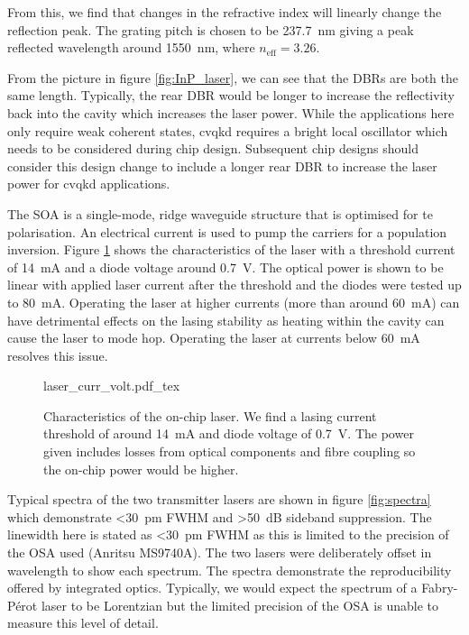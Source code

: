 From this, we find that changes in the refractive index will linearly change the reflection peak. The grating pitch is chosen to be \SI{237.7}{nm} giving a peak reflected wavelength around \SI{1550}{nm}, where $n_\text{eff} = 3.26$.

From the picture in figure \ref{fig:InP_laser}, we can see that the \acp{DBR} are both the same length. Typically, the rear \ac{DBR} would be longer to increase the reflectivity back into the cavity which increases the laser power. While the applications here only require weak coherent states, \ac{cvqkd} \cite{Ralph1999} requires a bright local oscillator which needs to be considered during chip design. Subsequent chip designs should consider this design change to include a longer rear \ac{DBR} to increase the laser power for \ac{cvqkd} applications.

The \ac{SOA} is a single-mode, ridge waveguide structure that is optimised for \ac{te} polarisation. An electrical current is used to pump the carriers for a population inversion. Figure \ref{fig:las_curr_volt} shows the characteristics of the laser with a threshold current of \SI{14}{\mA} and a diode voltage around \SI{0.7}{V}. The optical power is shown to be linear with applied laser current after the threshold and the diodes were tested up to \SI{80}{\mA}. Operating the laser at higher currents (more than around \SI{60}{\mA}) can have detrimental effects on the lasing stability as heating within the cavity can cause the laser to mode hop. Operating the laser at currents below \SI{60}{mA} resolves this issue.


\begin{figure}[t]
	\centering
	\tiny
	\def\svgwidth{\textwidth} 
	{laser_curr_volt.pdf_tex}
	\caption[Lasing current threshold and voltage]{Characteristics of the on-chip laser. We find a lasing current threshold of around \SI{14}{mA} and diode voltage of \SI{0.7}{V}. The power given includes losses from optical components and fibre coupling so the on-chip power would be higher.}
	\label{fig:las_curr_volt}
\end{figure}

Typical spectra of the two transmitter lasers are shown in figure \ref{fig:spectra} which demonstrate \SI{<30}{pm} \ac{FWHM} and \SI{>50}{dB} sideband suppression. The linewidth here is stated as \SI{<30}{pm} \ac{FWHM} as this is limited to the precision of the \ac{OSA} used (Anritsu MS9740A). The two lasers were deliberately offset in wavelength to show each spectrum. The spectra demonstrate the reproducibility offered by integrated optics. Typically, we would expect the spectrum of a Fabry-P\'{e}rot laser to be Lorentzian \cite{Ismail16} but the limited precision of the \ac{OSA} is unable to measure this level of detail. 

